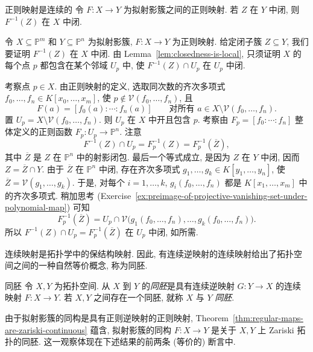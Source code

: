 \begin{Theorem}{正则映射是连续的}\leavevmode\label{thm:regular-maps-are-zariski-continuous}
令 $F:X\to Y$ 为拟射影簇之间的正则映射. 若 $Z$ 在 $Y$ 中闭, 则 $F^{-1}(Z)$ 在 $X$ 中闭.
\end{Theorem}
\begin{Proof}
令 $X\subseteq\mathbb{P}^{m}$ 和 $Y\subseteq\mathbb{P}^{n}$ 为拟射影簇, $F:X\to Y$ 为正则映射. 给定闭子簇 $Z\subseteq Y$, 我们要证明 $F^{-1}(Z)$ 在 $X$ 中闭. 由 Lemma~\ref{lem:closedness-is-local}, 只须证明 $X$ 的每个点 $p$ 都包含在某个邻域 $U_{p}$ 中, 使 $F^{-1}(Z)\cap U_{p}$ 在 $U_{p}$ 中闭.

考察点 $p\in X$. 由正则映射的定义, 选取同次数的齐次多项式 $f_{0},\ldots,f_{n}\in K[x_{0},\ldots,x_{m}]$, 使 $p\notin\mathcal{V}(f_{0},\ldots,f_{n})$, 且
\[
  F(a)=[f_{0}(a):\cdots:f_{n}(a)]
  \qquad\text{对所有 }a\in X\setminus\mathcal{V}(f_{0},\ldots,f_{n}).
\]
置 $U_{p}=X\setminus\mathcal{V}(f_{0},\ldots,f_{n})$. 则 $U_{p}$ 在 $X$ 中开且包含 $p$. 考察由 $F_{p}=[f_{0}:\cdots:f_{n}]$ 整体定义的正则函数 $F_{p}:U_{p}\to\mathbb{P}^{n}$. 注意
\[
  F^{-1}(Z)\cap U_{p}=F_{p}^{-1}(Z)=F_{p}^{-1}(\overline{Z}),
\]
其中 $\overline{Z}$ 是 $Z$ 在 $\mathbb{P}^{n}$ 中的射影闭包. 最后一个等式成立, 是因为 $Z$ 在 $Y$ 中闭, 因而 $Z=\overline{Z}\cap Y$. 由于 $\overline{Z}$ 在 $\mathbb{P}^{n}$ 中闭, 存在齐次多项式 $g_{1},\ldots,g_{k}\in K[y_{1},\ldots,y_{n}]$, 使 $\overline{Z}=\mathcal{V}(g_{1},\ldots,g_{k})$. 于是, 对每个 $i=1,\ldots,k$, $g_{i}(f_{0},\ldots,f_{n})$ 都是 $K[x_{1},\ldots,x_{m}]$ 中的齐次多项式. 稍加思考 (Exercise~\ref{ex:preimage-of-projective-vanishing-set-under-polynomial-map}) 可知
\[
  F_{p}^{-1}(\overline{Z})
  =U_{p}\cap\mathcal{V}\bigl(g_{1}(f_{0},\ldots,f_{n}),\ldots,g_{k}(f_{0},\ldots,f_{n})\bigr).
\]
所以 $F^{-1}(Z)\cap U_{p}=F_{p}^{-1}(\overline{Z})$ 在 $U_{p}$ 中闭, 如所需.
\end{Proof}

连续映射是拓扑学中的保结构映射. 因此, 有连续逆映射的连续映射给出了拓扑空间之间的一种自然等价概念, 称为同胚.

\begin{Definition}{同胚}\leavevmode\label{def:homeomorphism-of-topological-spaces}
令 $X,Y$ 为拓扑空间. 从 $X$ 到 $Y$ 的\emph{同胚}是具有连续逆映射 $G:Y\to X$ 的连续映射 $F:X\to Y$. 若 $X,Y$ 之间存在一个同胚, 就称 $X$ 与 $Y$ \emph{同胚}.
\end{Definition}

由于拟射影簇的同构是具有正则逆映射的正则映射, Theorem~\ref{thm:regular-maps-are-zariski-continuous} 蕴含, 拟射影簇的同构 $F:X\to Y$ 是关于 $X,Y$ 上 Zariski 拓扑的同胚. 这一观察体现在下述结果的前两条 (等价的) 断言中.

